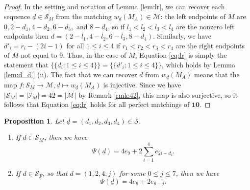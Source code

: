 \documentclass[10pt,a4paper]{amsart}
\newtheorem{prop}[theorem]{Proposition}
\numberwithin{equation}{section}
\newcommand{\ra}{\rightarrow}
\newcommand{\mset}[1]{\{\!\{#1\}\!\}}
\newcommand{\seqd}{\underline{d}}
\newcommand{\cali}{\mathcal{I}}
\newcommand{\calm}{\mathcal{M}}
\newcommand{\cals}{\mathcal{S}}
\newcommand{\ten}{\mathbf{10}}
\newcommand{\abs}[1]{\lvert #1 \rvert}
\begin{document}
\begin{proof}
In the setting and notation of Lemma \ref{lem:lr}, we can recover each sequence
$\seqd\in \cals_M$ from the matching $w_{\seqd}(M_A)\in \calm$: the left endpoints of
$M$ are $0, 2-d_1, 4-d_2, 6-d_3,$ and $8-d_4$, so if $l_1<l_2<l_3<l_4$ are the
nonzero left endpoints then $d=(2-l_1, 4-l_2, 6-l_3, 8-d_4)$. Similarly, we have
$d'_i=r_i-(2i-1)$ for all $1\le i\le 4$ if $r_1<r_2<r_3<r_4$ are the right
endpoints of $M$ not equal to 9. Thus, in the case of $M$, Equation
\eqref{eq:lr} is simply the statement that $\mset{d_i: 1\le i\le
4}=\mset{d'_i:1\le i\le 4}$, which holds by Lemma \ref{lem:d_d'} (ii). The
fact that we can recover $d$ from $w_{\seqd}(M_A)$ means that the map
$f:\cals_M\ra\calm, \seqd\mapsto w_{\seqd}(M_A)$ is injective. Since we have
$\abs{\cals_M}=\abs{\cali_M}=42=\abs{\calm}$ by Remark \ref{rmk:42}, this map is
also surjective, so it follows that Equation \eqref{eq:lr} holds for all perfect
matchings of $\ten$. 
\end{proof}

\begin{prop}
\label{prop:seq_to_sum}
Let $\seqd=(d_1,d_2,d_3,d_4)\in \cals$.
\begin{enumerate}
\item If $\seqd\in \cals_M$, then we have
\[
  \Psi(\seqd)=4e_9+2\sum_{i=1}^4 e_{2i-d_i}.
\]
\item If $\seqd\in \cals_F$, so that $\seqd=(1,2,4,j)$ for some $0\le j\le 7$, then we have 
\[
  \Psi(\seqd)=4e_9+2e_{8-j}.
\]
\end{enumerate} 
\end{prop}
\end{document}

